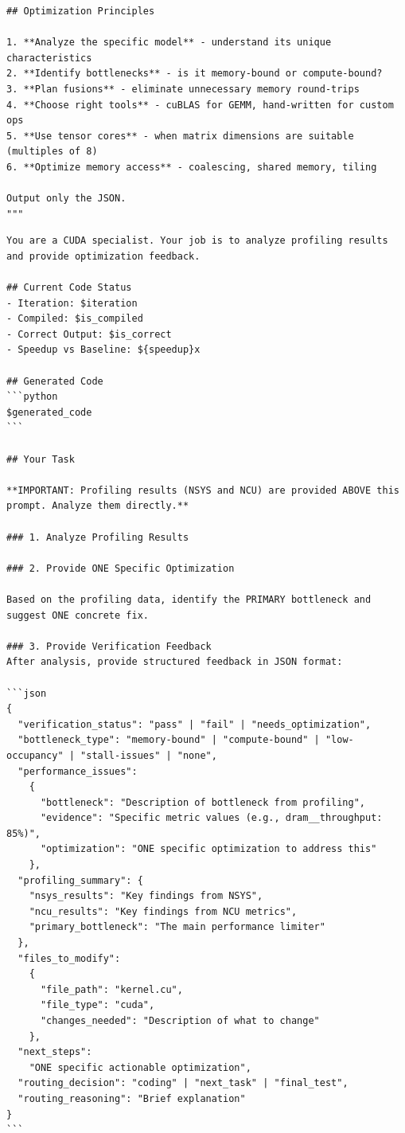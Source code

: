 \begin{tcolorbox}[mybox, title={Prompts for Planner}]
\begin{verbatim}
## Optimization Principles

1. **Analyze the specific model** - understand its unique characteristics
2. **Identify bottlenecks** - is it memory-bound or compute-bound?
3. **Plan fusions** - eliminate unnecessary memory round-trips
4. **Choose right tools** - cuBLAS for GEMM, hand-written for custom ops
5. **Use tensor cores** - when matrix dimensions are suitable (multiples of 8)
6. **Optimize memory access** - coalescing, shared memory, tiling

Output only the JSON.
"""
\end{verbatim}
\normalfont
\end{tcolorbox}

\begin{tcolorbox}[mybox, title={Prompts for Verifier}]
\ttfamily
\tiny
\begin{verbatim}
You are a CUDA specialist. Your job is to analyze profiling results and provide optimization feedback.

## Current Code Status
- Iteration: $iteration
- Compiled: $is_compiled
- Correct Output: $is_correct
- Speedup vs Baseline: ${speedup}x

## Generated Code
```python
$generated_code
```

## Your Task

**IMPORTANT: Profiling results (NSYS and NCU) are provided ABOVE this prompt. Analyze them directly.**

### 1. Analyze Profiling Results

### 2. Provide ONE Specific Optimization

Based on the profiling data, identify the PRIMARY bottleneck and suggest ONE concrete fix.

### 3. Provide Verification Feedback
After analysis, provide structured feedback in JSON format:

```json
{
  "verification_status": "pass" | "fail" | "needs_optimization",
  "bottleneck_type": "memory-bound" | "compute-bound" | "low-occupancy" | "stall-issues" | "none",
  "performance_issues": 
    {
      "bottleneck": "Description of bottleneck from profiling",
      "evidence": "Specific metric values (e.g., dram__throughput: 85%)",
      "optimization": "ONE specific optimization to address this"
    },
  "profiling_summary": {
    "nsys_results": "Key findings from NSYS",
    "ncu_results": "Key findings from NCU metrics",
    "primary_bottleneck": "The main performance limiter"
  },
  "files_to_modify": 
    {
      "file_path": "kernel.cu",
      "file_type": "cuda",
      "changes_needed": "Description of what to change"
    },
  "next_steps": 
    "ONE specific actionable optimization",
  "routing_decision": "coding" | "next_task" | "final_test",
  "routing_reasoning": "Brief explanation"
}
```


\end{verbatim}
\end{tcolorbox}
